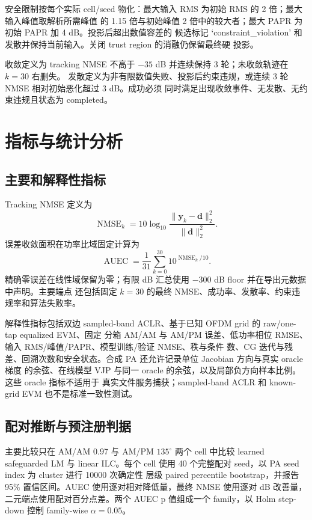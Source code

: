 \documentclass[UTF8,zihao=-4,a4paper]{ctexart}
\begin{document}
安全限制按每个实际 cell/seed 物化：最大输入 RMS 为初始 RMS 的 2 倍；最大输入峰值取解析所需峰值
的 1.15 倍与初始峰值 2 倍中的较大者；最大 PAPR 为初始 PAPR 加 4 dB。投影后超出数值容差的
候选标记 `constraint\_violation' 和发散并保持当前输入。关闭 trust region 的消融仍保留最终硬
投影。

收敛定义为 tracking NMSE 不高于 $-35$ dB 并连续保持 3 轮；未收敛轨迹在 $k=30$ 右删失。
发散定义为非有限数值失败、投影后约束违规，或连续 3 轮 NMSE 相对初始恶化超过 3 dB。成功必须
同时满足出现收敛事件、无发散、无约束违规且状态为 completed。

\section{指标与统计分析}

\subsection{主要和解释性指标}

Tracking NMSE 定义为
\begin{equation}
  \operatorname{NMSE}_k=10\log_{10}
  \frac{\lVert\bm y_k-\bm d\rVert_2^2}{\lVert\bm d\rVert_2^2}.
  \label{eq:nmse}
\end{equation}
误差收敛面积在功率比域固定计算为
\begin{equation}
  \operatorname{AUEC}=\frac{1}{31}\sum_{k=0}^{30}10^{\operatorname{NMSE}_k/10}.
  \label{eq:auec}
\end{equation}
精确零误差在线性域保留为零；有限 dB 汇总使用 $-300$ dB floor 并在导出元数据中声明。主要端点
还包括固定 $k=30$ 的最终 NMSE、成功率、发散率、约束违规率和算法失败率。

解释性指标包括双边 sampled-band ACLR、基于已知 OFDM grid 的 raw/one-tap equalized EVM、固定
分箱 AM/AM 与 AM/PM 误差、低功率相位 RMSE、输入 RMS/峰值/PAPR、模型训练/验证 NMSE、秩与条件
数、CG 迭代与残差、回溯次数和安全状态。合成 PA 还允许记录单位 Jacobian 方向与真实 oracle 梯度
的余弦、在线模型 VJP 与同一 oracle 的余弦，以及局部负方向样本比例。这些 oracle 指标不适用于
真实文件服务捕获；sampled-band ACLR 和 known-grid EVM 也不是标准一致性测试。

\subsection{配对推断与预注册判据}

主要比较只在 AM/AM 0.97 与 AM/PM $135^\circ$ 两个 cell 中比较 learned safeguarded LM 与
linear ILC。每个 cell 使用 40 个完整配对 seed，以 PA seed index 为 cluster 进行 10000 次确定性
层级 paired percentile bootstrap，并报告 95\% 置信区间。AUEC 使用逐对相对降低量，最终 NMSE
使用逐对 dB 改善量，二元端点使用配对百分点差。两个 AUEC p 值组成一个 family，以 Holm
step-down 控制 family-wise $\alpha=0.05$。
\end{document}
